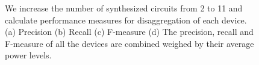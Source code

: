 \begin{figure}[!hbtp]
	\caption{
	We increase the number of synthesized circuits from 2 to 11 and
calculate performance measures for disaggregation of each device.
(a) Precision (b) Recall (c) F-measure (d) The precision, recall and F-measure
of all the devices are combined weighed by their average power levels.
}
	\label{fig_synresults}
\end{figure}

